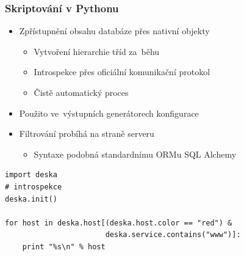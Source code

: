 \documentclass{beamer}
\begin{document}
\begin{frame}[fragile]
\begin{columns}
\begin{column}{.55\paperwidth}
\begin{textblock}{50}
\end{textblock}
\end{column}
\end{columns}
\end{frame}


\begin{frame}[fragile]
\frametitle{Skriptování v Pythonu}
\begin{itemize}
    \item Zpřístupnění obsahu databáze přes nativní objekty
        \begin{itemize}
            \item Vytvoření hierarchie tříd za~běhu
            \item Introspekce přes oficiální komunikační protokol
            \item Čistě automatický proces
        \end{itemize}
    \item Použito ve~výstupních generátorech konfigurace
    \item Filtrování probíhá na straně serveru
        \begin{itemize}
            \item Syntaxe podobná standardnímu ORMu SQL Alchemy
        \end{itemize}
\end{itemize}
\begin{verbatim}
import deska
# introspekce
deska.init()

for host in deska.host[(deska.host.color == "red") &
                       deska.service.contains("www")]:
    print "%s\n" % host
\end{verbatim}
\end{frame}
\end{document}
